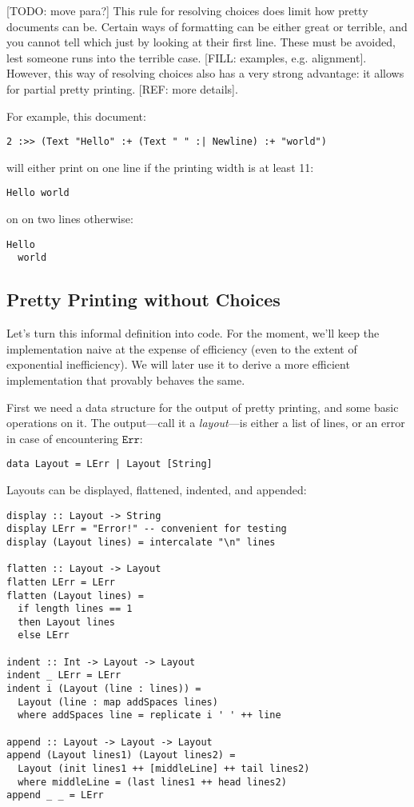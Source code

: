 \documentclass{article}
\newcommand{\err}{\texttt{Err}}
\begin{document}
[TODO: move para?] This rule for resolving choices does limit how pretty documents can be. Certain
ways of formatting can be either great or terrible, and you cannot tell which just by looking at
their first line.  These must be avoided, lest someone runs into the terrible case. [FILL: examples,
e.g. alignment].  However, this way of resolving choices also has a very strong advantage: it allows
for partial pretty printing. [REF: more details].

For example, this document:
\begin{lstlisting}
2 :>> (Text "Hello" :+ (Text " " :| Newline) :+ "world")
\end{lstlisting}
will either print on one line if the printing width is at least 11:
\begin{lstlisting}
Hello world
\end{lstlisting}
on on two lines otherwise:
\begin{lstlisting}
Hello
  world
\end{lstlisting}

\subsection{Pretty Printing without Choices}

Let's turn this informal definition into code. For the moment, we'll keep the implementation naive
at the expense of efficiency (even to the extent of exponential inefficiency). We will later use it to
derive a more efficient implementation that provably behaves the same.

First we need a data structure for the output of pretty printing, and some basic operations on it.
The output---call it a \emph{layout}---is either a list of lines, or an error in case of
encountering $\err$:

\begin{lstlisting}
data Layout = LErr | Layout [String]
\end{lstlisting}

Layouts can be displayed, flattened, indented, and appended:

\begin{lstlisting}
display :: Layout -> String
display LErr = "Error!" -- convenient for testing
display (Layout lines) = intercalate "\n" lines

flatten :: Layout -> Layout
flatten LErr = LErr
flatten (Layout lines) =
  if length lines == 1
  then Layout lines
  else LErr

indent :: Int -> Layout -> Layout
indent _ LErr = LErr
indent i (Layout (line : lines)) =
  Layout (line : map addSpaces lines)
  where addSpaces line = replicate i ' ' ++ line

append :: Layout -> Layout -> Layout
append (Layout lines1) (Layout lines2) =
  Layout (init lines1 ++ [middleLine] ++ tail lines2)
  where middleLine = (last lines1 ++ head lines2)
append _ _ = LErr
\end{lstlisting}
\end{document}

